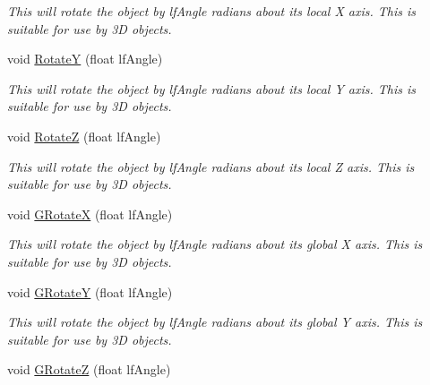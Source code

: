 \begin{DoxyCompactItemize}
\begin{DoxyCompactList}\small\item\em This will rotate the object by lfAngle radians about its local X axis. This is suitable for use by 3D objects. \end{DoxyCompactList}\item 
\hypertarget{classc_camera_matrix4_a86e20cd48f8a5427d98361d9b838273d}{
void \hyperlink{classc_camera_matrix4_a86e20cd48f8a5427d98361d9b838273d}{RotateY} (float lfAngle)}
\label{classc_camera_matrix4_a86e20cd48f8a5427d98361d9b838273d}

\begin{DoxyCompactList}\small\item\em This will rotate the object by lfAngle radians about its local Y axis. This is suitable for use by 3D objects. \end{DoxyCompactList}\item 
\hypertarget{classc_camera_matrix4_ab0d7c6b5cdc0b9581633736404a3b843}{
void \hyperlink{classc_camera_matrix4_ab0d7c6b5cdc0b9581633736404a3b843}{RotateZ} (float lfAngle)}
\label{classc_camera_matrix4_ab0d7c6b5cdc0b9581633736404a3b843}

\begin{DoxyCompactList}\small\item\em This will rotate the object by lfAngle radians about its local Z axis. This is suitable for use by 3D objects. \end{DoxyCompactList}\item 
\hypertarget{classc_camera_matrix4_a09c8d44629bf63643c8f09ccdc2294bc}{
void \hyperlink{classc_camera_matrix4_a09c8d44629bf63643c8f09ccdc2294bc}{GRotateX} (float lfAngle)}
\label{classc_camera_matrix4_a09c8d44629bf63643c8f09ccdc2294bc}

\begin{DoxyCompactList}\small\item\em This will rotate the object by lfAngle radians about its global X axis. This is suitable for use by 3D objects. \end{DoxyCompactList}\item 
\hypertarget{classc_camera_matrix4_a48eb5374c0e7fa4eca25f48a6411052d}{
void \hyperlink{classc_camera_matrix4_a48eb5374c0e7fa4eca25f48a6411052d}{GRotateY} (float lfAngle)}
\label{classc_camera_matrix4_a48eb5374c0e7fa4eca25f48a6411052d}

\begin{DoxyCompactList}\small\item\em This will rotate the object by lfAngle radians about its global Y axis. This is suitable for use by 3D objects. \end{DoxyCompactList}\item 
\hypertarget{classc_camera_matrix4_a993d7410719b1fd7d871f728527a3947}{
void \hyperlink{classc_camera_matrix4_a993d7410719b1fd7d871f728527a3947}{GRotateZ} (float lfAngle)}
\label{classc_camera_matrix4_a993d7410719b1fd7d871f728527a3947}


\end{DoxyCompactItemize}
